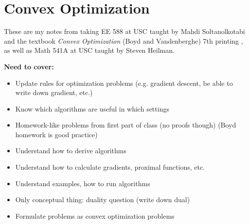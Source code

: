 %
%
%
%
%
%
%
%
%
%
%
%
%
%

\section{Convex Optimization}

These are my notes from taking EE 588 at USC taught by Mahdi Soltanolkotabi and the textbook \textit{Convex Optimization} (Boyd and Vandenberghe) 7th printing \citep{boyd2004convex}, as well as Math 541A at USC taught by Steven Heilman.

\textbf{Need to cover:}

\begin{itemize}

\item Update rules for optimization problems (e.g. gradient descent, be able to write down gradient, etc.)

\item Know which algorithms are useful in which settings

\item Homework-like problems from first part of class (no proofs though) (Boyd homework is good practice)

\item Understand how to derive algorithms

\item Understand how to calculate gradients, proximal functions, etc.

\item Understand examples, how to run algorithms

\item Only conceptual thing: duality question (write down dual)

\item Formulate problems as convex optimization problems

\end{itemize}

